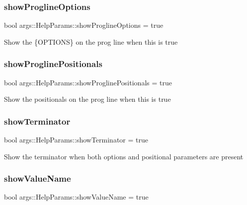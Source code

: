 \subsubsection{\texorpdfstring{show\+Progline\+Options}{showProglineOptions}}
{\footnotesize\ttfamily bool args\+::\+Help\+Params\+::show\+Progline\+Options = true}

Show the \{O\+P\+T\+I\+O\+NS\} on the prog line when this is true \mbox{\label{structargs_1_1_help_params_aa7986e35f4a56eafb4d398af67d929d5}} 
\subsubsection{\texorpdfstring{show\+Progline\+Positionals}{showProglinePositionals}}
{\footnotesize\ttfamily bool args\+::\+Help\+Params\+::show\+Progline\+Positionals = true}

Show the positionals on the prog line when this is true \mbox{\label{structargs_1_1_help_params_a359999b309ec9ae528468e7aabbbf355}} 
\subsubsection{\texorpdfstring{show\+Terminator}{showTerminator}}
{\footnotesize\ttfamily bool args\+::\+Help\+Params\+::show\+Terminator = true}

Show the terminator when both options and positional parameters are present \mbox{\label{structargs_1_1_help_params_a2c758b53a35f03ec5f7b0682b82c1ad4}} 
\subsubsection{\texorpdfstring{show\+Value\+Name}{showValueName}}
{\footnotesize\ttfamily bool args\+::\+Help\+Params\+::show\+Value\+Name = true}

